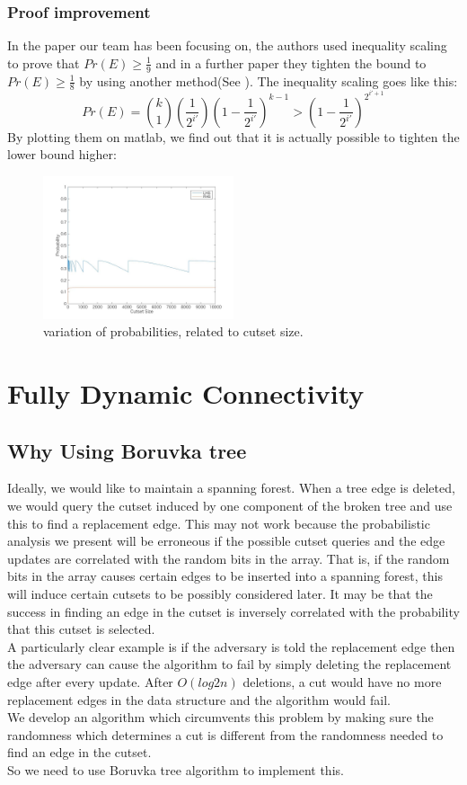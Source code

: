 \documentclass[conference,compsoc]{IEEEtran}
\begin{document}
\subsubsection*{Proof improvement} In the paper our team has been focusing on, the authors used inequality scaling to prove that $Pr(E) \ge \frac{1}{9}$ and in a further paper they tighten the bound to $Pr(E) \ge \frac{1}{8}$ by using another method(See \cite{article}). The inequality scaling goes like this:
$$Pr(E)={k \choose 1}(\frac{1}{2^{i'}})(1-\frac{1}{2^{i'}})^{k-1} > (1-\frac{1}{2^{i'}})^{2^{i'+1}}$$
By plotting them on matlab, we find out that it is actually possible to tighten the lower bound higher:
\begin{figure}[H]
	\centering
	\includegraphics[width=0.5\textwidth]{Pic/fig.jpg}
	\caption{ variation of probabilities, related to cutset size.}
	\label{fig:7}
\end{figure}


\section{Fully Dynamic Connectivity}
\subsection{Why Using Boruvka tree}
Ideally, we would like to maintain a spanning forest. When a tree edge is deleted, we would query the cutset induced by one component of the broken tree and use this to find a replacement edge. This may not work because the probabilistic analysis we present will be erroneous if the possible cutset queries and the edge updates are correlated with the random bits in the array. That is, if the random bits in the array
causes certain edges to be inserted into a spanning forest, this will induce certain cutsets to be possibly considered later. It may be that the success in finding an edge in the cutset is inversely correlated with the probability that this cutset is selected.\\ A particularly
clear example is if the adversary is told the replacement edge then the adversary can cause the algorithm to fail by simply deleting the replacement edge after every update. After $O(log2 n)$ deletions, a cut would have no more replacement edges in the data structure and the
algorithm would fail.\\
We develop an algorithm which circumvents this
problem by making sure the randomness which determines
a cut is different from the randomness needed to
find an edge in the cutset.\\
So we need to use Boruvka tree algorithm to implement this.
\end{document}
